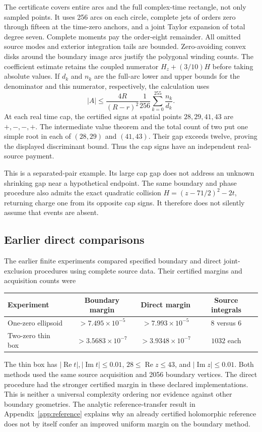 The certificate covers entire arcs and the full complex-time rectangle,
not only sampled points. It uses 256 arcs on each circle, complete jets
of orders zero through fifteen at the time-zero anchors, and a
joint Taylor expansion of total degree seven. Complete moments pay the
order-eight remainder. All omitted source modes and exterior integration
tails are bounded. Zero-avoiding convex disks around the boundary image
arcs justify the polygonal winding counts. The coefficient estimate
retains the coupled numerator $H_z+(3/10)H$ before taking absolute
values. If $d_k$ and $n_k$ are the full-arc lower and upper bounds for
the denominator and this numerator, respectively, the calculation uses
\[
 |A|\leq\frac{4R}{(R-r)^2}\frac1{256}\sum_{k=0}^{255}\frac{n_k}{d_k}.
\]
At each real time cap, the certified signs at spatial points
$28,29,41,43$ are $+,-,-,+$. The intermediate value theorem and the
total count of two put one simple root in each of $(28,29)$ and
$(41,43)$. Their gap exceeds twelve, proving the displayed
discriminant bound. Thus the cap signs have an independent real-source
payment.

This is a separated-pair example. Its large cap gap does not address an
unknown shrinking gap near a hypothetical endpoint. The same boundary
and phase procedure also admits the exact quadratic collision
$H=(z-71/2)^2-2t$, returning charge one from its opposite cap signs.
It therefore does not silently assume that events are absent.

\subsection{Earlier direct comparisons}

The earlier finite experiments \cite{note01,note03} compared specified
boundary and direct joint-exclusion procedures using complete source
data. Their certified margins and acquisition counts were
\begin{center}
\begin{tabular}{@{}lccc@{}}
\toprule
Experiment & Boundary margin & Direct margin & Source integrals\\
\midrule
One-zero ellipsoid & $>7.495\times10^{-5}$ & $>7.993\times10^{-5}$ & $8$ versus $6$\\
Two-zero thin box & $>3.5683\times10^{-7}$ & $>3.9348\times10^{-7}$ & $1032$ each\\
\bottomrule
\end{tabular}
\end{center}
The thin box has $|\operatorname{Re}t|,|\operatorname{Im}t|\leq0.01$,
$28\leq\operatorname{Re}z\leq43$, and
$|\operatorname{Im}z|\leq0.01$. Both methods used the same source
acquisition and 2056 boundary vertices. The direct procedure had the
stronger certified margin in these declared implementations. This is
neither a universal complexity ordering nor evidence against other
boundary geometries. The analytic reference-transfer result in
Appendix~\ref{app:reference} explains why an already certified
holomorphic reference does not by itself confer an improved uniform
margin on the boundary method.

